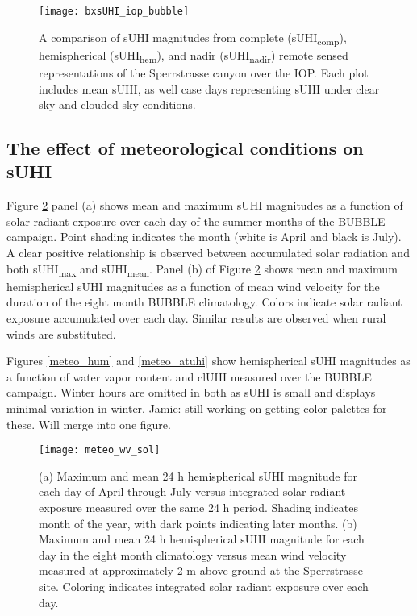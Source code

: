 \begin{bibunit}
\begin{figure}[H]
	\centering
	\texttt{[image: bxsUHI\_iop\_bubble]}
	\caption{A comparison of sUHI magnitudes from complete (sUHI\textsubscript{comp}), hemispherical (sUHI\textsubscript{hem}), and nadir (sUHI\textsubscript{nadir}) remote sensed representations of the Sperrstrasse canyon over the IOP. Each plot includes mean sUHI, as well case days representing sUHI under clear sky and clouded sky conditions.}
	\label{bx_suhi_compare}
\end{figure}

\subsection{The effect of meteorological conditions on sUHI}

Figure \ref{meteo_wv_sol} panel (a) shows mean and maximum sUHI magnitudes as a function of solar radiant exposure over each day of the summer months of the BUBBLE campaign. Point shading indicates the month (white is April and black is July). A clear positive relationship is observed between accumulated solar radiation and both sUHI\textsubscript{max} and sUHI\textsubscript{mean}. Panel (b) of Figure \ref{meteo_wv_sol} shows mean and maximum hemispherical sUHI magnitudes as a function of mean wind velocity for the duration of the eight month BUBBLE climatology. Colors indicate solar radiant exposure accumulated over each day. Similar results are observed when rural winds are substituted.

Figures \ref{meteo_hum} and \ref{meteo_atuhi} show hemispherical sUHI magnitudes as a function of water vapor content and clUHI measured over the BUBBLE campaign. Winter hours are omitted in both as sUHI is small and displays minimal variation in winter. Jamie: still working on getting color palettes for these. Will merge into one figure. 

\begin{figure}[H]
	\centering
	\texttt{[image: meteo\_wv\_sol]}
	\caption{(a) Maximum and mean 24 \si{\hour} hemispherical sUHI magnitude for each day of April through July versus integrated solar radiant exposure measured over the same 24 \si{\hour} period. Shading indicates month of the year, with dark points indicating later months. (b) Maximum and mean 24 \si{\hour} hemispherical sUHI magnitude for each day in the eight month climatology versus mean wind velocity measured at approximately 2 \si{\meter} above ground at the Sperrstrasse site. Coloring indicates integrated solar radiant exposure over each day.}
	\label{meteo_wv_sol}
\end{figure}


\end{bibunit}
